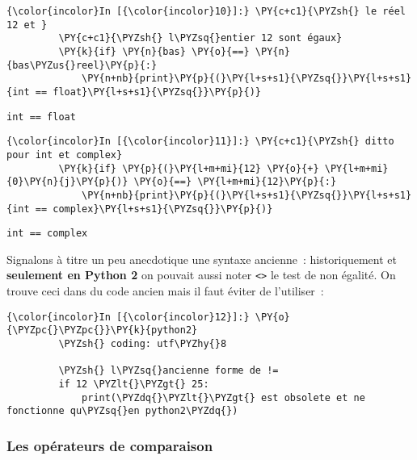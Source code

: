     \begin{Verbatim}[commandchars=\\\{\}]
{\color{incolor}In [{\color{incolor}10}]:} \PY{c+c1}{\PYZsh{} le réel 12 et }
         \PY{c+c1}{\PYZsh{} l\PYZsq{}entier 12 sont égaux}
         \PY{k}{if} \PY{n}{bas} \PY{o}{==} \PY{n}{bas\PYZus{}reel}\PY{p}{:}
             \PY{n+nb}{print}\PY{p}{(}\PY{l+s+s1}{\PYZsq{}}\PY{l+s+s1}{int == float}\PY{l+s+s1}{\PYZsq{}}\PY{p}{)}
\end{Verbatim}


    \begin{Verbatim}[commandchars=\\\{\}]
int == float

    \end{Verbatim}

    \begin{Verbatim}[commandchars=\\\{\}]
{\color{incolor}In [{\color{incolor}11}]:} \PY{c+c1}{\PYZsh{} ditto pour int et complex}
         \PY{k}{if} \PY{p}{(}\PY{l+m+mi}{12} \PY{o}{+} \PY{l+m+mi}{0}\PY{n}{j}\PY{p}{)} \PY{o}{==} \PY{l+m+mi}{12}\PY{p}{:}
             \PY{n+nb}{print}\PY{p}{(}\PY{l+s+s1}{\PYZsq{}}\PY{l+s+s1}{int == complex}\PY{l+s+s1}{\PYZsq{}}\PY{p}{)}
\end{Verbatim}


    \begin{Verbatim}[commandchars=\\\{\}]
int == complex

    \end{Verbatim}

    Signalons à titre un peu anecdotique une syntaxe ancienne~:
historiquement et \textbf{seulement en Python 2} on pouvait aussi noter
\texttt{\textless{}\textgreater{}} le test de non égalité. On trouve
ceci dans du code ancien mais il faut éviter de l'utiliser~:

    \begin{Verbatim}[commandchars=\\\{\}]
{\color{incolor}In [{\color{incolor}12}]:} \PY{o}{\PYZpc{}\PYZpc{}}\PY{k}{python2}
         \PYZsh{} coding: utf\PYZhy{}8
         
         \PYZsh{} l\PYZsq{}ancienne forme de !=
         if 12 \PYZlt{}\PYZgt{} 25:
             print(\PYZdq{}\PYZlt{}\PYZgt{} est obsolete et ne fonctionne qu\PYZsq{}en python2\PYZdq{})
\end{Verbatim}


    \hypertarget{les-opuxe9rateurs-de-comparaison}{%
\subsubsection{Les opérateurs de
comparaison}\label{les-opuxe9rateurs-de-comparaison}}

